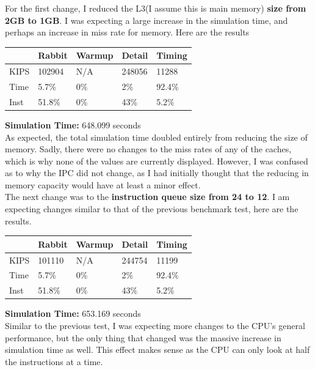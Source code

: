 \documentclass[12pt]{article}
\begin{document}
For the first change, I reduced the L3(I assume this is main memory) \textbf{size from 2GB to 1GB}. I was expecting a large increase in the simulation time, and perhaps an increase in miss rate for memory. Here are the results

\begin{table}[!h]
\begin{tabular}{|l|l|l|l|l|}
\hline
\rowcolor[HTML]{C0C0C0} 
                             & Rabbit & Warmup & Detail & Timing \\ \hline
\cellcolor[HTML]{C0C0C0}KIPS & 102904 & N/A    & 248056 & 11288  \\ \hline
\cellcolor[HTML]{C0C0C0}Time & 5.7\%  & 0\%    & 2\%    & 92.4\% \\ \hline
\cellcolor[HTML]{C0C0C0}Inst & 51.8\% & 0\%    & 43\%   & 5.2\%  \\ \hline
\end{tabular}
\end{table}
\textbf{Simulation Time:} 648.099 seconds\\
As expected, the total simulation time doubled entirely from reducing the size of memory. Sadly, there were no changes to the miss rates of any of the caches, which is why none of the values are currently displayed. However, I was confused as to why the IPC did not change, as I had initially thought that the reducing in memory capacity would have at least a minor effect.\\

The next change was to the \textbf{instruction queue size from 24 to 12}. I am expecting changes similar to that of the previous benchmark test, here are the results.

\begin{table}[!h]
\begin{tabular}{|l|l|l|l|l|}
\hline
\rowcolor[HTML]{C0C0C0} 
                             & Rabbit & Warmup & Detail & Timing \\ \hline
\cellcolor[HTML]{C0C0C0}KIPS & 101110 & N/A    & 244754 & 11199  \\ \hline
\cellcolor[HTML]{C0C0C0}Time & 5.7\%  & 0\%    & 2\%    & 92.4\% \\ \hline
\cellcolor[HTML]{C0C0C0}Inst & 51.8\% & 0\%    & 43\%   & 5.2\%  \\ \hline
\end{tabular}
\end{table}
\textbf{Simulation Time:} 653.169 seconds\\
Similar to the previous test, I was expecting more changes to the CPU's general performance, but the only thing that changed was the massive increase in simulation time as well. This effect makes sense as the CPU can only look at half the instructions at a time.
\end{document}
